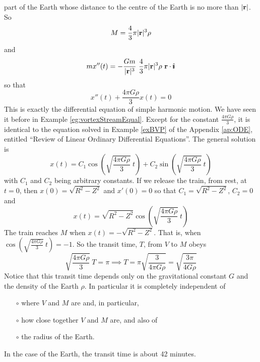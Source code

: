 \begin{eg}
{\begin{nfig}
\begin{center}
\end{center}
\end{nfig}
}
part of the Earth whose distance to the centre of the Earth is no more 
than $|\mathbf{r}|$. So
\begin{equation*}
M = \frac{4}{3}\pi |\mathbf{r}|^3\rho
\end{equation*}
and
\begin{equation*}
mx''(t) = -\frac{Gm}{|\mathbf{r}|^3}\  \frac{4}{3}\pi |\mathbf{r}|^3\rho\ \mathbf{r}\cdot\hat{\pmb{\imath}}
\end{equation*}
so that
\begin{equation*}
x''(t) + \frac{4\pi G\rho}{3} x(t) = 0
\end{equation*}
This is exactly the differential equation of simple harmonic motion.
We have seen it before in Example \ref{eg:vortexStreamEqual}.
Except for the constant $\frac{4\pi G\rho}{3}$, it is identical to the
equation solved in Example \ref{exBVP} of the Appendix \ref{ap:ODE}, entitled
``Review of Linear Ordinary Differential Equations''. 
The general solution is
\begin{equation*}
x(t)  = C_1 \cos\left(\sqrt{\frac{4\pi G\rho}{3}}\ t\right) 
             +  C_2 \sin\left(\sqrt{\frac{4\pi G\rho}{3}}\ t\right) 
\end{equation*}
with $C_1$ and $C_2$ being arbitrary constants. If we release the train, 
from rest, at $t=0$, then $x(0) = \sqrt{R^2-Z^2}$ and $x'(0)=0$
so that $C_1= \sqrt{R^2-Z^2}$, $C_2=0$ and
\begin{equation*}
x(t)  = \sqrt{R^2-Z^2} \cos\left(\sqrt{\frac{4\pi G\rho}{3}}\ t\right) 
\end{equation*}
The train reaches $M$ when $x(t)  = -\sqrt{R^2-Z^2}$. That is, when
$\cos\left(\sqrt{\frac{4\pi G\rho}{3}}\ t\right)=-1$. So the transit
time, $T$, from $V$ to $M$ obeys
\begin{equation*}
\sqrt{\frac{4\pi G\rho}{3}}\ T=\pi
\implies
T= \pi  \sqrt{\frac{3}{4\pi G\rho}}
  = \sqrt{\frac{3\pi}{4 G\rho}}
\end{equation*}
Notice that this transit time depends only on the gravitational constant
$G$ and the density of the Earth $\rho$. In particular it is 
completely independent of  
\begin{itemize}\itemsep1pt \parskip0pt  %
\item[$\circ$]
where $V$ and $M$ are and, in particular, 
\item[$\circ$]
how close together $V$ and $M$ are, and also of
\item[$\circ$]
the radius of the Earth.
\end{itemize}
In the case of the Earth, the transit time is about 42 minutes.


\end{eg}
